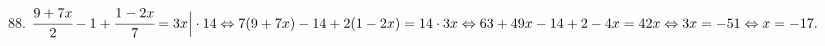 88. $\cfrac{9+7x}{2}-1+\cfrac{1-2x}{7}=3x\Big|\cdot14\Leftrightarrow
7(9+7x)-14+2(1-2x)=14\cdot3x\Leftrightarrow 63+49x-14+2-4x=42x\Leftrightarrow3x=-51\Leftrightarrow x=-17.$\\

